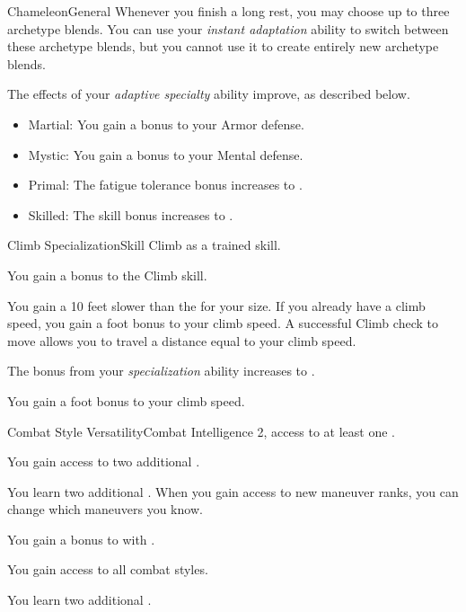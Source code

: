\begin{feat}{Chameleon}{General}
        Whenever you finish a long rest, you may choose up to three archetype blends.
        You can use your \textit{instant adaptation} ability to switch between these archetype blends, but you cannot use it to create entirely new archetype blends.

         The effects of your \textit{adaptive specialty} ability improve, as described below.
        \begin{itemize}
            \item Martial: You gain a  bonus to your Armor defense.
            \item Mystic: You gain a  bonus to your Mental defense.
            \item Primal: The fatigue tolerance bonus increases to .
            \item Skilled: The skill bonus increases to .
        \end{itemize}
    \end{feat}

    \begin{feat}{Climb Specialization}{Skill}
        \featpre Climb as a trained skill.

         You gain a  bonus to the Climb skill.

         You gain a  10 feet slower than the  for your size.
        If you already have a climb speed, you gain a  foot bonus to your climb speed.
        A successful Climb check to move allows you to travel a distance equal to your climb speed.

         The bonus from your \textit{specialization} ability increases to .

         You gain a  foot bonus to your climb speed.
    \end{feat}

    \begin{feat}{Combat Style Versatility}{Combat}
        \featpre Intelligence 2, access to at least one .

         You gain access to two additional .

         You learn two additional .
        When you gain access to new maneuver ranks, you can change which maneuvers you know.

         You gain a  bonus to  with .

         You gain access to all combat styles.

         You learn two additional .
    \end{feat}

